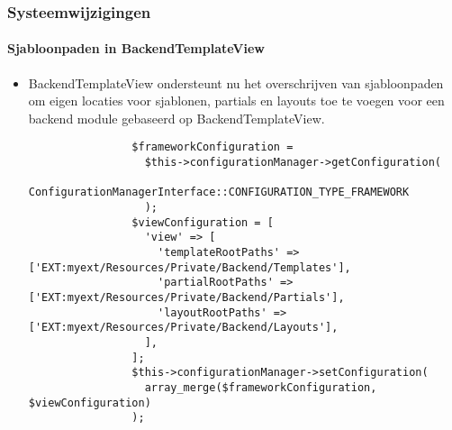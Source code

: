 \begin{frame}[fragile]
	\frametitle{Systeemwijzigingen}
	\framesubtitle{Sjabloonpaden in BackendTemplateView}

	\lstset{basicstyle=\tiny\ttfamily}

	\begin{itemize}
		\item BackendTemplateView ondersteunt nu het overschrijven van sjabloonpaden om eigen locaties
			voor sjablonen, partials en layouts toe te voegen voor een backend module gebaseerd op
			BackendTemplateView.

			\begin{lstlisting}
				$frameworkConfiguration =
				  $this->configurationManager->getConfiguration(
				    ConfigurationManagerInterface::CONFIGURATION_TYPE_FRAMEWORK
				  );
				$viewConfiguration = [
				  'view' => [
				    'templateRootPaths' => ['EXT:myext/Resources/Private/Backend/Templates'],
				    'partialRootPaths' => ['EXT:myext/Resources/Private/Backend/Partials'],
				    'layoutRootPaths' => ['EXT:myext/Resources/Private/Backend/Layouts'],
				  ],
				];
				$this->configurationManager->setConfiguration(
				  array_merge($frameworkConfiguration, $viewConfiguration)
				);
			\end{lstlisting}

	\end{itemize}

\end{frame}


